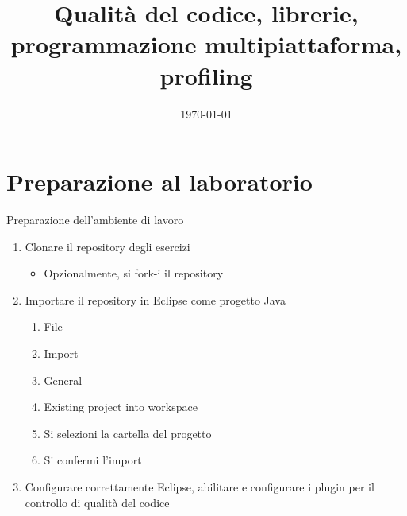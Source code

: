 \documentclass[presentation]{beamer}
\title[{\lab} -- Code quality]{Qualità del codice, librerie, programmazione multipiattaforma, profiling}
\date[\today]{\today}
\begin{document}
\frame[label=coverpage]{\titlepage}

\section{Preparazione al laboratorio}

\begin{frame}{Preparazione dell'ambiente di lavoro}
	\begin{enumerate}
		\item Clonare il repository degli esercizi
		\begin{itemize}
            \item Opzionalmente, si fork-i il repository
		\end{itemize}
		\item Importare il repository in Eclipse come progetto Java
		\begin{enumerate}
			\item File
			\item Import
			\item General
			\item Existing project into workspace
			\item Si selezioni la cartella del progetto
			\item Si confermi l'import
		\end{enumerate}
		\item \alert{Configurare correttamente Eclipse, abilitare e configurare i plugin per il controllo di qualità del codice}
	\end{enumerate}
\end{frame}
\end{document}
